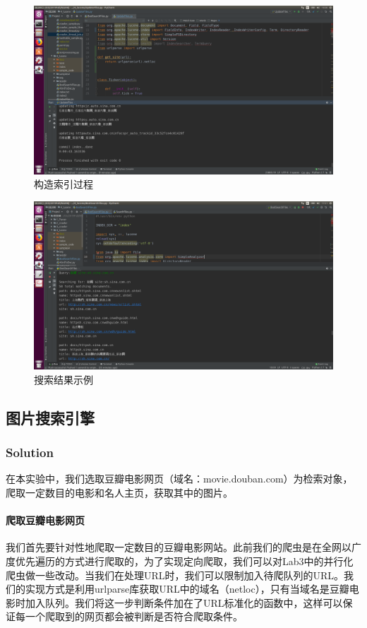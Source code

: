 \documentclass{article}
\begin{document}
\begin{figure}[htbp]
\centering
\includegraphics[width=14.5cm]{img/siteupdate.png}
\caption{构造索引过程}
\label{fig:siteindex}
\end{figure}


\begin{figure}[htbp]
\centering
\includegraphics[width=14.5cm]{img/sitesearch2.png}
\caption{搜索结果示例}
\label{fig:sitetest}
\end{figure}




\subsection{图片搜索引擎}

\subsubsection{Solution}
在本实验中，我们选取豆瓣电影网页（域名：movie.douban.com）为检索对象，爬取一定数目的电影和名人主页，获取其中的图片。

\paragraph{爬取豆瓣电影网页}
我们首先要针对性地爬取一定数目的豆瓣电影网站。此前我们的爬虫是在全网以广度优先遍历的方式进行爬取的，为了实现定向爬取，我们可以对Lab3中的并行化爬虫做一些改动。当我们在处理URL时，我们可以限制加入待爬队列的URL。我们的实现方式是利用urlparse库获取URL中的域名（netloc），只有当域名是豆瓣电影时加入队列。我们将这一步判断条件加在了URL标准化的函数中，这样可以保证每一个爬取到的网页都会被判断是否符合爬取条件。
\end{document}
